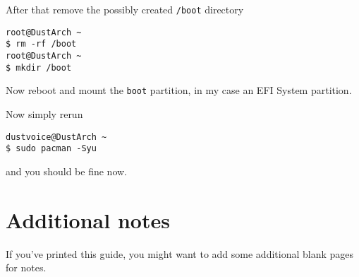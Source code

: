 \documentclass[10pt]{dustdoc}
\begin{document}
After that remove the possibly created \texttt{/boot} directory

\begin{verbatim}
root@DustArch ~
$ rm -rf /boot
root@DustArch ~
$ mkdir /boot
\end{verbatim}

Now reboot and mount the \texttt{boot} partition, in my case an EFI System partition.

Now simply rerun

\begin{verbatim}
dustvoice@DustArch ~
$ sudo pacman -Syu
\end{verbatim}

\noindent
and you should be fine now.

\chapter{Additional notes}
\label{sec:additional-notes}

If you’ve printed this guide, you might want to add some additional blank pages for notes.
\end{document}
